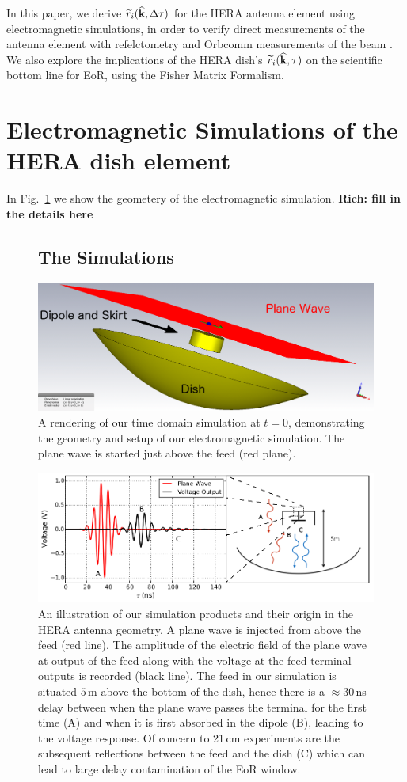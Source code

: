 \documentclass[twocolumn]{emulateapj}
\begin{document}
 In this paper, we derive $\widetilde{r}_i({\bf \widehat{k}},\Delta \tau)$ for the HERA antenna element using electromagnetic simulations, in order to verify direct measurements of the antenna element with refelctometry \citep{Patra:2015} and Orbcomm measurements of the beam \citep{Neben:2015b}. We also explore the implications of the HERA dish's $\widetilde{r}_i({\bf \widehat{k}},\tau)$ on the scientific bottom line for EoR, using the Fisher Matrix Formalism. 

\section{Electromagnetic Simulations of the HERA dish element}\label{sec:Simulations}
In Fig.~\ref{fig:SimulationSetup} we show the geometery of the electromagnetic simulation. {\bf Rich: fill in the details here}
\begin{figure}


\subsection{The Simulations}
\includegraphics[width=.5\textwidth]{figures/One_dish_Pfeed_render_pw_0deg.png}
\caption{A rendering of our time domain simulation at $t=0$, demonstrating the geometry and setup of our electromagnetic simulation. The plane wave is started just above the feed (red plane).}\label{fig:SimulationSetup}
\end{figure}

\begin{figure}
\includegraphics[width=\textwidth]{figures/SimulationIllustration.png}
\caption{An illustration of our simulation products and their origin in the HERA antenna geometry. A plane wave is injected from above the feed (red line). The amplitude of the electric field of the plane wave at output of the feed along with the voltage at the feed terminal outputs is recorded (black line). The feed in our simulation is situated $5$\,m above the bottom of the dish, hence there is a $\approx 30$\,ns delay between when the plane wave passes the terminal for the first time (A) and when it is first absorbed in the dipole (B), leading to the voltage response. Of concern to 21\,cm experiments are the subsequent reflections between the feed and the dish (C) which can lead to large delay contamination of the EoR window.}
\label{fig:Simulation}
\end{figure}
\end{document}
